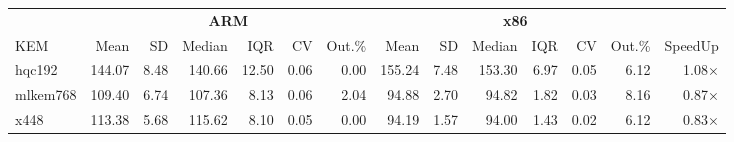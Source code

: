 \begin{table}[!ht]
\centering
\begin{tabular}{l|rrrrrr|rrrrrr|r}
\toprule
& \multicolumn{6}{c}{\bfseries ARM} & \multicolumn{6}{c}{\bfseries x86} & \\
\cmidrule(lr){2-7} \cmidrule(lr){8-13}
KEM & Mean & SD & Median & IQR & CV & Out.\% & Mean & SD & Median & IQR & CV & Out.\% & SpeedUp \\
\midrule
hqc192 & 144.07 & 8.48 & 140.66 & 12.50 & 0.06 & 0.00 & 155.24 & 7.48 & 153.30 & 6.97 & 0.05 & 6.12 & 1.08× \\
mlkem768 & 109.40 & 6.74 & 107.36 & 8.13 & 0.06 & 2.04 & 94.88 & 2.70 & 94.82 & 1.82 & 0.03 & 8.16 & 0.87× \\
x448 & 113.38 & 5.68 & 115.62 & 8.10 & 0.05 & 0.00 & 94.19 & 1.57 & 94.00 & 1.43 & 0.02 & 6.12 & 0.83× \\
\bottomrule
\end{tabular}
\end{table}
